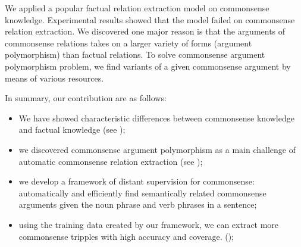 We applied a popular factual relation extraction model on commonsense knowledge. Experimental results showed that the model failed on commonsense relation extraction. 
We discovered one major reason is that the arguments of commonsense relations takes on a larger variety of forms (argument polymorphism) than factual relations. %
To solve commonsense argument polymorphism problem, we find variants of a given commonsense argument by means of various resources.

In summary, our contribution are as follows:
\begin{itemize}
\item We have showed characteristic differences between commonsense knowledge and
factual  knowledge (see );
	\item we discovered commonsense argument polymorphism as a main challenge 
of automatic commonsense relation extraction (see );
	\item we develop a framework of distant supervision for commonsense: automatically and efficiently find semantically related commonsense arguments given the noun phrase and verb phrases in a sentence;
	\item using the training data created by our framework, we can extract more commonsense tripples with high accuracy and coverage. (); 
\end{itemize}

